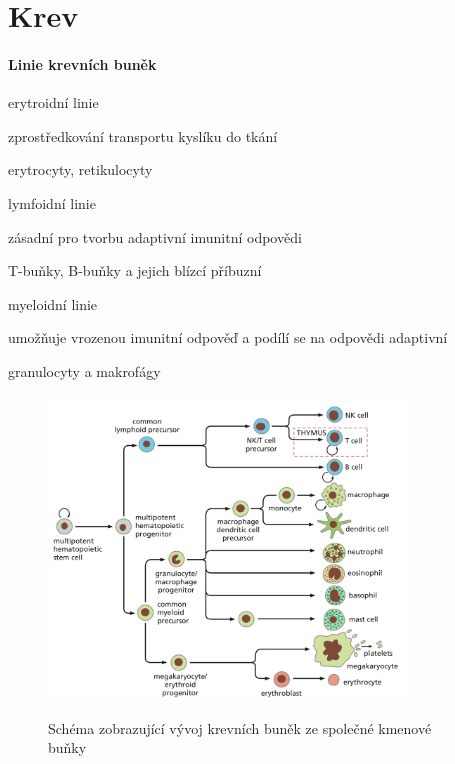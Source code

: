 \documentclass[DIV=8]{scrreprt}
\begin{document}
\section{Krev} \label{Krev} \FloatBarrier




\paragraph{Linie krevních buněk}
\begin{myItemize}[nosep]
    \item erytroidní linie
\begin{myItemize}[nosep]
    \item zprostředkování transportu kyslíku do tkání
    \item erytrocyty, retikulocyty
\end{myItemize}

    \item lymfoidní linie
\begin{myItemize}[nosep]
    \item zásadní pro tvorbu adaptivní imunitní odpovědi
    \item T-buňky, B-buňky a jejich blízcí příbuzní
\end{myItemize}

    \item myeloidní linie
\begin{myItemize}[nosep]
    \item umožňuje vrozenou imunitní odpověď a podílí se na odpovědi adaptivní
    \item granulocyty a makrofágy
\end{myItemize}

\end{myItemize}



\begin{figure}
    \caption{Schéma zobrazující vývoj krevních buněk ze společné kmenové buňky}
    \includegraphics[width=0.85\textwidth]{vyvoj_krevinch_bunek.png}
    \centering
    \label{}
\end{figure}
\end{document}
